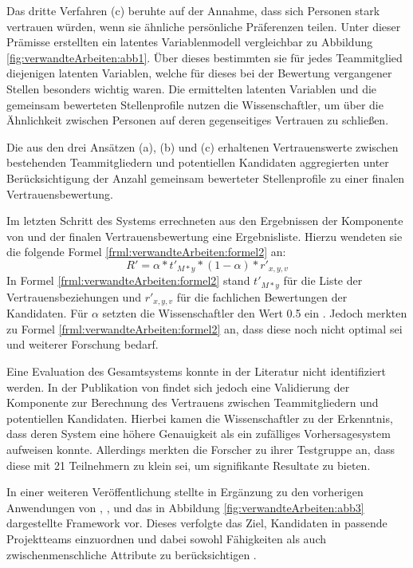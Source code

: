 Das dritte Verfahren (c) beruhte auf der Annahme, dass sich Personen stark vertrauen würden, wenn sie ähnliche persönliche Präferenzen teilen. Unter dieser Prämisse erstellten \textcite[S. 6f.]{malinowski:2005} ein latentes Variablenmodell vergleichbar zu Abbildung \ref{fig:verwandteArbeiten:abb1}. Über dieses bestimmten sie für jedes Teammitglied diejenigen latenten Variablen, welche für dieses bei der Bewertung vergangener Stellen besonders wichtig waren. Die ermittelten latenten Variablen und die gemeinsam bewerteten Stellenprofile nutzen die Wissenschaftler, um über die Ähnlichkeit zwischen Personen auf deren gegenseitiges Vertrauen zu schließen.

Die aus den drei Ansätzen (a), (b) und (c) erhaltenen Vertrauenswerte zwischen bestehenden Teammitgliedern und potentiellen Kandidaten aggregierten \textcite[S. 7ff.]{malinowski:2005} unter Berücksichtigung der Anzahl gemeinsam bewerteter Stellenprofile zu einer finalen Vertrauensbewertung.

Im letzten Schritt des Systems errechneten \textcite[S. 9f.]{malinowski:2005} aus den Ergebnissen der Komponente von \textcite[S. 8ff.]{faerber:2003} und der finalen Vertrauensbewertung eine Ergebnisliste. Hierzu wendeten sie die folgende Formel \ref{frml:verwandteArbeiten:formel2} an:
\begin{equation}
	R' = \alpha * t'_{M*y} * (1-\alpha) * r'_{x,y,v}
	\label{frml:verwandteArbeiten:formel2}
\end{equation}
In Formel \ref{frml:verwandteArbeiten:formel2} stand $t'_{M*y}$ für die Liste der Vertrauensbeziehungen und $r'_{x,y,v}$ für die fachlichen Bewertungen der Kandidaten. Für $\alpha$ setzten die Wissenschaftler den Wert 0.5 ein \cite[S. 4ff.]{malinowski:2005}. Jedoch merkten \textcite[S. 9]{malinowski:2005} zu Formel \ref{frml:verwandteArbeiten:formel2} an, dass diese noch nicht optimal sei und weiterer Forschung bedarf.

Eine Evaluation des Gesamtsystems konnte in der Literatur nicht identifiziert werden. In der Publikation von \textcite[S. 13ff.]{malinowski:2008} findet sich jedoch eine Validierung der Komponente zur Berechnung des Vertrauens zwischen Teammitgliedern und potentiellen Kandidaten. Hierbei kamen die Wissenschaftler zu der Erkenntnis, dass deren System eine höhere Genauigkeit als ein zufälliges Vorhersagesystem aufweisen konnte. Allerdings merkten die Forscher zu ihrer Testgruppe an, dass diese mit 21 Teilnehmern zu klein sei, um signifikante Resultate zu bieten.

In einer weiteren Veröffentlichung stellte \textcite[S. 1ff.]{keim:2007} in Ergänzung zu den vorherigen Anwendungen von \textcite[S. 6ff.]{faerber:2003}, \textcite[S. 4ff.]{keim:2005}, \textcite[S. 4ff.]{malinowski:2005} und \textcite[S. 3ff.]{malinowski:2006} das in Abbildung \ref{fig:verwandteArbeiten:abb3} dargestellte Framework vor. Dieses verfolgte das Ziel, Kandidaten in passende Projektteams einzuordnen und dabei sowohl Fähigkeiten als auch zwischenmenschliche Attribute zu berücksichtigen \cite[S. 1ff.]{keim:2007}.

